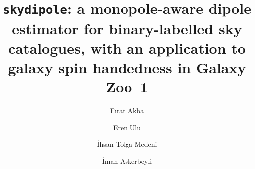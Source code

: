 \documentclass[preprint,12pt]{elsarticle}
\begin{document}
\begin{frontmatter}

\title{\texttt{skydipole}: a monopole-aware dipole estimator for binary-labelled sky catalogues, with an application to galaxy spin handedness in Galaxy Zoo~1}

\author[tedu]{F\i rat Akba}
\author[tedu]{Eren Ulu}
\author[aybu]{\.{I}hsan Tolga Medeni}
\author[au]{\.{I}man Askerbeyli}
\address[tedu]{Department of Computer Engineering, TED University, Ankara, Turkey}
\address[aybu]{Department of Management Information Systems, Ankara Y\i ld\i r\i m Beyaz\i t University, Ankara, Turkey}
\address[au]{Department of Computer Engineering, Ankara University, Ankara, Turkey}


\end{frontmatter}
\end{document}
